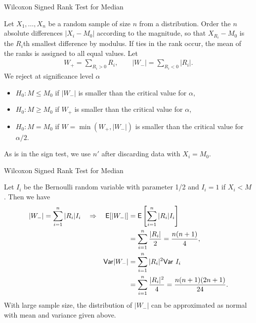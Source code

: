 \begin{frame}{Wilcoxon Signed Rank Test for Median}

\justifying
{} Let $X_1, \ldots, X_n$ be a random sample of size $n$ from a  distribution. Order the $n$ absolute differences $|X_i - M_0|$ according to the magnitude, so that $X_{R_i} - M_0$ is the $R_i$th smallest difference by modulus. If ties in the rank occur, the mean of the ranks is assigned to all equal values. Let
\begin{align*}
W_+ = \sum_{R_i > 0} R_i, \qquad |W_-| = \sum_{R_i < 0} |R_i|.
\end{align*}
We reject at significance level $\alpha$
\begin{itemize}
	\justifying
	\item $H_0: M\leq M_0$ if $|W_-|$ is smaller than the critical value for $\alpha$,
	\item $H_0: M\geq M_0$ if $W_+$ is smaller than the critical value for $\alpha$,
	\item $H_0: M = M_0$ if $W = \min(W_+, |W_-|)$ is smaller than the critical value for $\alpha/2$.
\end{itemize}
As is in the sign test, we use $n'$ after discarding data with $X_i = M_0$.

\end{frame}

\begin{frame}{Wilcoxon Signed Rank Test for Median}

\justifying
{} Let $I_i$ be the Bernoulli random variable with parameter 1/2 and $I_i = 1$ if $X_i < M$. Then we have
\begin{align*}
|W_-| = \sum_{i=1}^n |R_i|I_i \quad\Rightarrow\quad \mathsf{E}[|W_-|] & = \mathsf{E}\left[\sum_{i=1}^n |R_i|I_i \right] \\
& = \sum_{i=1}^n \frac{|R_i|}{2} = \frac{n(n+1)}{4}, \\
\mathsf{Var}|W_-| & = \sum_{i=1}^n |R_i|^2\mathsf{Var}\ I_i \\
& = \sum_{i=1}^n \frac{|R_i|^2}{4} = \frac{n(n+1)(2n+1)}{24}.
\end{align*}
With large sample size, the distribution of $|W_-|$ can be approximated as normal with mean and variance given above.


\end{frame}



